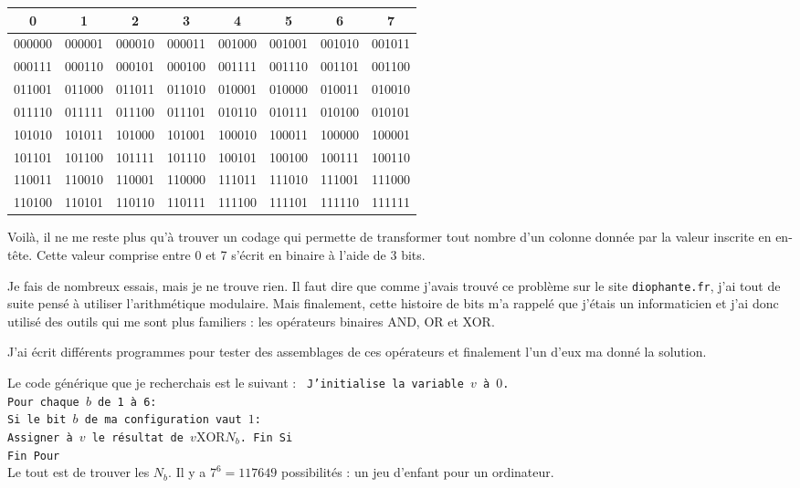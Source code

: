 \documentclass[10pt,a4paper,onecolumn]{article}
\begin{document}
\begin{tabular}{|c|c|c|c|c|c|c|c|}
\hline
\bf 0 & \bf 1 & \bf 2 & \bf 3 & \bf 4 & \bf 5 & \bf 6 & \bf 7 \\ \hline
000000 & 000001 & 000010 & 000011 & 001000 & 001001 & 001010 & 001011 \\
000111 & 000110 & 000101 & 000100 & 001111 & 001110 & 001101 & 001100 \\
011001 & 011000 & 011011 & 011010 & 010001 & 010000 & 010011 & 010010 \\
011110 & 011111 & 011100 & 011101 & 010110 & 010111 & 010100 & 010101 \\
101010 & 101011 & 101000 & 101001 & 100010 & 100011 & 100000 & 100001 \\
101101 & 101100 & 101111 & 101110 & 100101 & 100100 & 100111 & 100110 \\
110011 & 110010 & 110001 & 110000 & 111011 & 111010 & 111001 & 111000 \\
110100 & 110101 & 110110 & 110111 & 111100 & 111101 & 111110 & 111111 \\
\hline
\end{tabular}


Voilà, il ne me reste plus qu'à trouver un codage qui permette de transformer tout nombre d'un colonne donnée par la valeur inscrite en en-tête. Cette valeur comprise entre 0 et 7 s'écrit en binaire à l'aide de 3 bits.

Je fais de nombreux essais, mais je ne trouve rien. Il faut dire que comme j'avais trouvé ce problème sur le site {\tt diophante.fr},  j'ai tout de suite pensé à utiliser l’arithmétique modulaire. Mais finalement, cette histoire de bits m'a rappelé que j'étais un informaticien et j'ai donc utilisé des outils qui me sont plus familiers : les opérateurs binaires AND, OR et XOR.

J'ai écrit différents programmes pour tester des assemblages de ces opérateurs et finalement l'un d'eux ma donné la solution.

Le code générique que je recherchais est le suivant :
{\tt
J'initialise la variable $v$ à $0$.\\
Pour chaque $b$ de 1 à 6:\\
\hspace{8mm}Si le bit $b$ de ma configuration vaut $1$:\\
\hspace{16mm}Assigner à $v$ le résultat de $v\text{XOR}N_b$.
\hspace{8mm}Fin Si\\
Fin Pour\\
}
Le tout est de trouver les $N_b$. Il y a $7^6= 117649$ possibilités : un jeu d'enfant pour un ordinateur.
\end{document}
